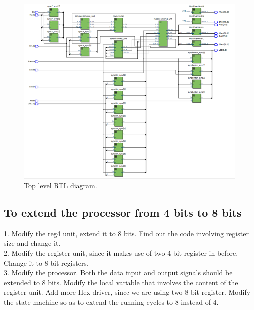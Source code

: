 \documentclass[12pt]{article}
\begin{document}
\begin{figure}[H]
    \centering
    \includegraphics{toplevel_RTL.png}
    \caption{Top level RTL diagram.}
\end{figure}
\subsection{To extend the processor from 4 bits to 8 bits}
1. Modify the reg4 unit, extend it to 8 bits. Find out the code involving register size and change it. \\

2. Modify the register unit, since it makes use of two 4-bit register in before. Change it to 8-bit registers. \\

3. Modify the processor. Both the data input and output signals should be extended to 8 bits. Modify the local variable that involves the content of the register unit. Add more Hex driver, since we are using two 8-bit register. Modify the state machine so as to extend the running cycles to 8 instead of 4.
\end{document}
